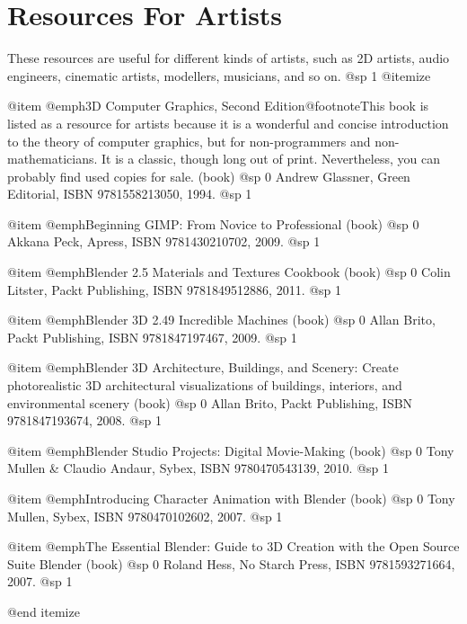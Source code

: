 \section{Resources For Artists}
These resources are useful for different kinds of artists, such as 2D artists, audio engineers, cinematic artists, modellers, musicians, and so on.
@sp 1
@itemize

@item
@emph{3D Computer Graphics, Second Edition}@footnote{This book is listed as a resource for artists because it is a wonderful and concise introduction to the theory of computer graphics, but for non-programmers and non-mathematicians. It is a classic, though long out of print. Nevertheless, you can probably find used copies for sale.} (book)
@sp 0
Andrew Glassner, Green Editorial, ISBN 9781558213050, 1994.
@sp 1

@item
@emph{Beginning GIMP: From Novice to Professional} (book)
@sp 0
Akkana Peck, Apress, ISBN 9781430210702, 2009.
@sp 1

@item
@emph{Blender 2.5 Materials and Textures Cookbook} (book)
@sp 0
Colin Litster, Packt Publishing, ISBN 9781849512886, 2011.
@sp 1

@item
@emph{Blender 3D 2.49 Incredible Machines} (book)
@sp 0
Allan Brito, Packt Publishing, ISBN 9781847197467, 2009.
@sp 1

@item
@emph{Blender 3D Architecture, Buildings, and Scenery: Create photorealistic 3D architectural visualizations of buildings, interiors, and environmental scenery} (book)
@sp 0
Allan Brito, Packt Publishing, ISBN 9781847193674, 2008.
@sp 1

@item
@emph{Blender Studio Projects: Digital Movie-Making} (book)
@sp 0
Tony Mullen & Claudio Andaur, Sybex, ISBN 9780470543139, 2010.
@sp 1

@item
@emph{Introducing Character Animation with Blender} (book)
@sp 0
Tony Mullen, Sybex, ISBN 9780470102602, 2007.
@sp 1

@item
@emph{The Essential Blender: Guide to 3D Creation with the Open Source Suite Blender} (book)
@sp 0
Roland Hess, No Starch Press, ISBN 9781593271664, 2007.
@sp 1

@end itemize

